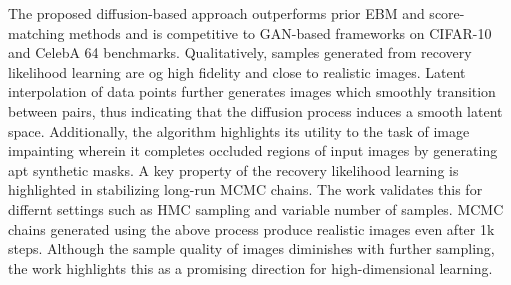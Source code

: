\documentclass[11pt,letterpaper]{article}
\begin{document}
The proposed diffusion-based approach outperforms prior EBM and score-matching methods and is competitive to GAN-based frameworks on CIFAR-10 and CelebA 64 benchmarks. Qualitatively, samples generated from recovery likelihood learning are og high fidelity and close to realistic images. Latent interpolation of data points further generates images which smoothly transition between pairs, thus indicating that the diffusion process induces a smooth latent space. Additionally, the algorithm highlights its utility to the task of image impainting wherein it completes occluded regions of input images by generating apt synthetic masks. A key property of the recovery likelihood learning is highlighted in stabilizing long-run MCMC chains. The work validates this for differnt settings such as HMC sampling and variable number of samples. MCMC chains generated using the above process produce realistic images even after 1k steps. Although the sample quality of images diminishes with further sampling, the work highlights this as a promising direction for high-dimensional learning. 
\end{document}

